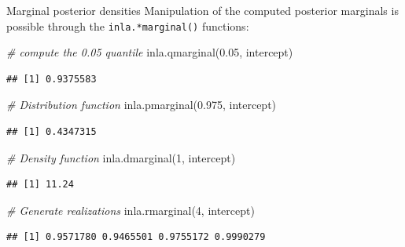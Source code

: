 \documentclass[
  ignorenonframetext,
]{beamer}
\newenvironment{Shaded}{\begin{snugshade}}{\end{snugshade}}
\newcommand{\CommentTok}[1]{\textcolor[rgb]{0.56,0.35,0.01}{\textit{#1}}}
\newcommand{\DecValTok}[1]{\textcolor[rgb]{0.00,0.00,0.81}{#1}}
\newcommand{\FloatTok}[1]{\textcolor[rgb]{0.00,0.00,0.81}{#1}}
\newcommand{\FunctionTok}[1]{\textcolor[rgb]{0.00,0.00,0.00}{#1}}
\newcommand{\NormalTok}[1]{#1}
\begin{document}
\begin{frame}[fragile]{Marginal posterior densities}
\protect\hypertarget{marginal-posterior-densities-2}{}
Manipulation of the computed posterior marginals is possible through the
\texttt{inla.*marginal()} functions:

\small

\begin{Shaded}
\begin{Highlighting}[]
\CommentTok{\# compute the 0.05 quantile}
\FunctionTok{inla.qmarginal}\NormalTok{(}\FloatTok{0.05}\NormalTok{, intercept)}
\end{Highlighting}
\end{Shaded}

\begin{verbatim}
## [1] 0.9375583
\end{verbatim}

\begin{Shaded}
\begin{Highlighting}[]
\CommentTok{\# Distribution function}
\FunctionTok{inla.pmarginal}\NormalTok{(}\FloatTok{0.975}\NormalTok{, intercept)}
\end{Highlighting}
\end{Shaded}

\begin{verbatim}
## [1] 0.4347315
\end{verbatim}

\begin{Shaded}
\begin{Highlighting}[]
\CommentTok{\# Density function}
\FunctionTok{inla.dmarginal}\NormalTok{(}\DecValTok{1}\NormalTok{, intercept)}
\end{Highlighting}
\end{Shaded}

\begin{verbatim}
## [1] 11.24
\end{verbatim}

\begin{Shaded}
\begin{Highlighting}[]
\CommentTok{\# Generate realizations}
\FunctionTok{inla.rmarginal}\NormalTok{(}\DecValTok{4}\NormalTok{, intercept)}
\end{Highlighting}
\end{Shaded}

\begin{verbatim}
## [1] 0.9571780 0.9465501 0.9755172 0.9990279
\end{verbatim}

\normalsize
\end{frame}
\end{document}
